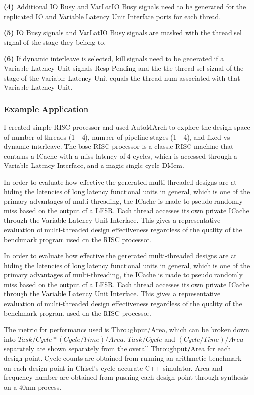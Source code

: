 {\bf (4)} Additional IO Busy and VarLatIO Busy signals need to be generated for the replicated IO and Variable Latency Unit Interface ports for each thread.

{\bf (5)} IO Busy signals and VarLatIO Busy signals are masked with the thread sel signal of the stage they belong to.

{\bf (6)} If dynamic interleave is selected, kill signals need to be generated if a Variable Latency Unit signals Resp Pending and the the thread sel signal of the stage of the Variable Latency Unit equals the thread num associated with that Variable Latency Unit.

\subsubsection{Example Application}
I created simple RISC processor and used AutoMArch to explore the design space of number of threads (1 - 4), number of pipeline stages (1 - 4), and fixed vs dynamic interleave. The base RISC processor is a classic RISC machine that contains a ICache with a miss latency of 4 cycles, which is accessed through a Variable Latency Interface, and a magic single cycle DMem. 

In order to evaluate how effective the generated multi-threaded designs are at hiding the latencies of long latency functional units in general, which is one of the primary advantages of multi-threading, the ICache is made to pseudo randomly miss based on the output of a LFSR. Each thread accesses its own private ICache through the Variable Latency Unit Interface. This gives a representative evaluation of multi-threaded design effectiveness regardless of the quality of the benchmark program used on the RISC processor.

In order to evaluate how effective the generated multi-threaded designs are at hiding the latencies of long latency functional units in general, which is one of the primary advantages of multi-threading, the ICache is made to pseudo randomly miss based on the output of a LFSR. Each thread accesses its own private ICache through the Variable Latency Unit Interface. This gives a representative evaluation of multi-threaded design effectiveness regardless of the quality of the benchmark program used on the RISC processor.

The metric for performance used is Throughput/Area, which can be broken down into $Task/Cycle * (Cycle/Time)/Area$. $Task/Cycle$ and $(Cycle/Time)/Area$ separately are shown separately from the overall Throughput{\tt /}Area for each design point. Cycle counts are obtained from running an arithmetic benchmark on each design point in Chisel's cycle accurate C++ simulator. Area and frequency number are obtained from pushing each design point through synthesis on a 40nm process.

